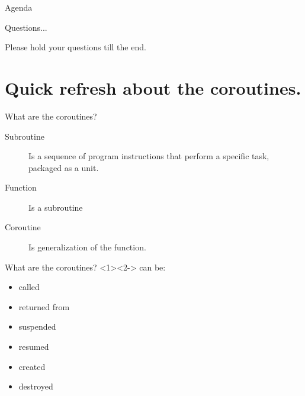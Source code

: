 \documentclass[10pt]{beamer}
\begin{document}
\begin{frame}{Agenda}
	\tableofcontents
\end{frame}

\begin{frame}{Questions...}

\vfill
\centerline{Please hold your questions till the end.}
\vfill

\end{frame}

\section{Quick refresh about the coroutines.}

\begin{frame}{What are the coroutines?}
\vfill

\begin{description}
	\item [Subroutine] Is a sequence of program instructions that perform a specific task, packaged as a unit.
	\item [Function] Is a subroutine
	\item [Coroutine] Is generalization of the function.
\end{description}

\vfill
\end{frame}

\begin{frame}{What are the coroutines?}
	\alert{<2->} can be:
	\begin{itemize}
		\item called
		\item returned from
		\item<2-|alert@2> \alert<+>{suspended}
		\item<3-|alert@3> resumed
		\item<4-|alert@4> created
		\item<5-|alert@5> destroyed
	\end{itemize}
\end{frame}
\end{document}
